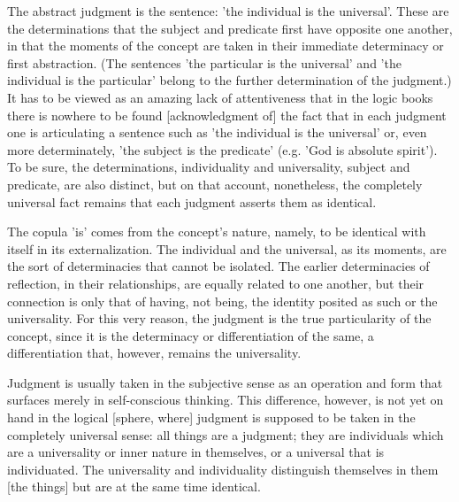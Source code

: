 The abstract judgment is the sentence:
'the individual is the universal'.
These are the determinations
that the subject and predicate
first have opposite one another,
in that the moments of the concept are taken
in their immediate determinacy or first abstraction.
(The sentences 'the particular is the universal' and
'the individual is the particular' belong to
the further determination of the judgment.)
It has to be viewed as an amazing lack of attentiveness that
in the logic books there is nowhere to be found [acknowledgment of]
the fact that in each judgment
one is articulating a sentence such as
'the individual is the universal'
or, even more determinately,
'the subject is the predicate'
(e.g. 'God is absolute spirit').
To be sure, the determinations, individuality and universality,
subject and predicate, are also distinct,
but on that account, nonetheless,
the completely universal fact remains that
each judgment asserts them as identical.

The copula 'is' comes from the concept's nature, namely,
to be identical with itself in its externalization.
The individual and the universal, as its moments,
are the sort of determinacies that cannot be isolated.
The earlier determinacies of reflection, in their relationships,
are equally related to one another,
but their connection is only that of having, not being,
the identity posited as such or the universality.
For this very reason, the judgment is
the true particularity of the concept,
since it is the determinacy or differentiation of the same,
a differentiation that, however, remains the universality.

Judgment is usually taken in the subjective sense
as an operation and form that surfaces
merely in self-conscious thinking.
This difference, however, is not yet on hand
in the logical [sphere, where]
judgment is supposed to be taken
in the completely universal sense:
all things are a judgment;
they are individuals which are a universality
or inner nature in themselves,
or a universal that is individuated.
The universality and individuality
distinguish themselves in them [the things]
but are at the same time identical.

